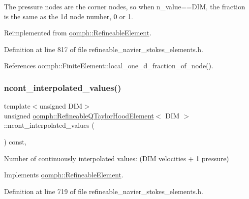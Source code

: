 The pressure nodes are the corner nodes, so when n\+\_\+value==D\+IM, the fraction is the same as the 1d node number, 0 or 1. 



Reimplemented from \hyperlink{classoomph_1_1RefineableElement_ac4e4ae5374154855ae9b072c6269f76e}{oomph\+::\+Refineable\+Element}.



Definition at line 817 of file refineable\+\_\+navier\+\_\+stokes\+\_\+elements.\+h.



References oomph\+::\+Finite\+Element\+::local\+\_\+one\+\_\+d\+\_\+fraction\+\_\+of\+\_\+node().

\mbox{\label{classoomph_1_1RefineableQTaylorHoodElement_ab47675822b8632474fc4e3e435fc19bf}} 
\subsubsection{\texorpdfstring{ncont\+\_\+interpolated\+\_\+values()}{ncont\_interpolated\_values()}}
{\footnotesize\ttfamily template$<$unsigned D\+IM$>$ \\
unsigned \hyperlink{classoomph_1_1RefineableQTaylorHoodElement}{oomph\+::\+Refineable\+Q\+Taylor\+Hood\+Element}$<$ D\+IM $>$\+::ncont\+\_\+interpolated\+\_\+values (\begin{DoxyParamCaption}{ }\end{DoxyParamCaption}) const\hspace{0.3cm}{\ttfamily [inline]}, {\ttfamily [virtual]}}



Number of continuously interpolated values\+: (D\+IM velocities + 1 pressure) 



Implements \hyperlink{classoomph_1_1RefineableElement_a53e171a18c9f43f1db90a6876516a073}{oomph\+::\+Refineable\+Element}.



Definition at line 719 of file refineable\+\_\+navier\+\_\+stokes\+\_\+elements.\+h.

